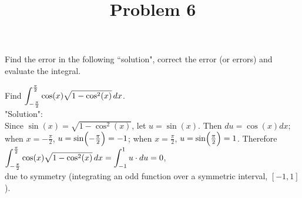 \documentclass{ximera}
\title[Problem 6]{Problem 6}
\begin{document}
\begin{abstract} \end{abstract}
\maketitle

\begin{problem}
Find the error in the following ``solution", correct the error (or errors) and evaluate the integral.

Find $\displaystyle \int_{-\frac{\pi}{2}}^{\frac{\pi}{2}} \cos(x)\sqrt{1-\cos^2(x)}\,d x$.\\[1em]
"Solution":\\[1em]
Since $\sin(x)=\sqrt{1-\cos^2(x)}$, let $u=\sin(x)$. Then $du=\cos(x)dx$; \\[1em]
when $x=-\frac{\pi}{2}$, $u=\sin\Bigl(-\frac{\pi}{2}\Bigr)=-1$; when $x=\frac{\pi}{2}$, $u=\sin\Bigl(\frac{\pi}{2}\Bigr)=1$. Therefore\\[1em]
	$\displaystyle \int_{-\frac{\pi}{2}}^{\frac{\pi}{2}} \cos(x)\sqrt{1-\cos^2(x)}\,d x=\displaystyle \int_{-1}^{1}u \cdot du=0$,\\[1em] due to symmetry (integrating an odd function over a symmetric interval, $[-1,1]$).

\end{problem}
\end{document}

